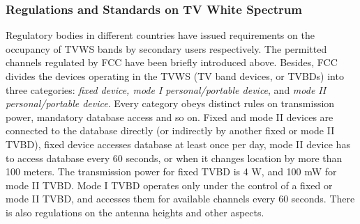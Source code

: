 \subsubsection{Regulations and Standards on TV White Spectrum}

Regulatory bodies in different countries have issued requirements on the occupancy of TVWS bands by secondary users respectively. 
The permitted channels regulated by FCC have been briefly introduced above.
Besides, FCC divides the devices operating in the TVWS (TV band devices, or \glspl{TVBD}) into three categories: \textit{fixed device, mode I personal/portable device}, and \textit{mode II personal/portable device}. 
Every category obeys distinct rules on transmission power, mandatory database access and so on.
Fixed and mode II devices are connected to the database directly (or indirectly by another fixed or mode II TVBD), fixed device accesses database at least once per day, mode II device has to access database every 60 seconds, or when it changes location by more than 100 meters.
The transmission power for fixed TVBD is 4 W, and 100 mW for mode II TVBD. 
Mode I TVBD operates only under the control of a fixed or mode II TVBD, and accesses them for available channels every 60 seconds.
There is also regulations on the antenna heights and other aspects.

